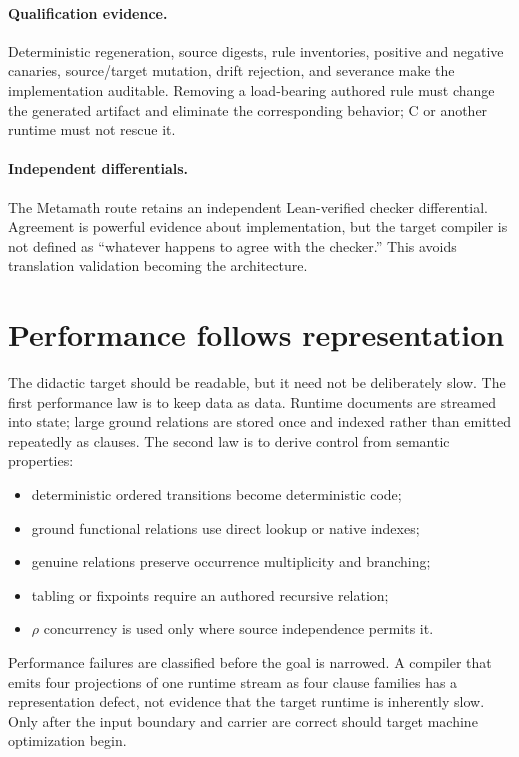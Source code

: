 \documentclass[11pt]{article}
\theoremstyle{remark}
\begin{document}
\paragraph{Qualification evidence.}
Deterministic regeneration, source digests, rule inventories, positive and
negative canaries, source/target mutation, drift rejection, and severance make
the implementation auditable.  Removing a load-bearing authored rule must
change the generated artifact and eliminate the corresponding behavior; C or
another runtime must not rescue it.

\paragraph{Independent differentials.}
The Metamath route retains an independent Lean-verified checker differential.
Agreement is powerful evidence about implementation, but the target compiler
is not defined as ``whatever happens to agree with the checker.''  This avoids
translation validation becoming the architecture.

\section{Performance follows representation}

The didactic target should be readable, but it need not be deliberately slow.
The first performance law is to keep data as data.  Runtime documents are
streamed into state; large ground relations are stored once and indexed rather
than emitted repeatedly as clauses.  The second law is to derive control from
semantic properties:
\begin{itemize}
\item deterministic ordered transitions become deterministic code;
\item ground functional relations use direct lookup or native indexes;
\item genuine relations preserve occurrence multiplicity and branching;
\item tabling or fixpoints require an authored recursive relation;
\item $\rho$ concurrency is used only where source independence permits it.
\end{itemize}

Performance failures are classified before the goal is narrowed.  A compiler
that emits four projections of one runtime stream as four clause families has
a representation defect, not evidence that the target runtime is inherently
slow.  Only after the input boundary and carrier are correct should target
machine optimization begin.
\end{document}

